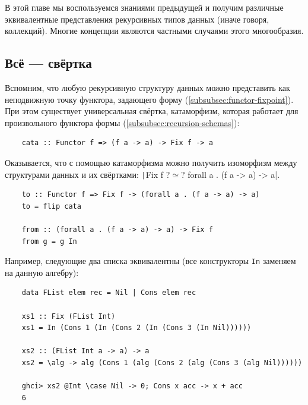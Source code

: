 
В этой главе мы воспользуемся знаниями предыдущей и получим различные эквивалентные представления рекурсивных типов данных (иначе говоря, коллекций).
Многие концепции являются частными случаями этого многообразия.

\subsection{Всё --- свёртка} \label{subsec:all-folds}

Вспомним, что любую рекурсивную структуру данных можно представить как неподвижную точку функтора, задающего форму (\ref{subsubsec:functor-fixpoint}).
При этом существует универсальная свёртка, катаморфизм, которая работает для произвольного функтора формы (\ref{subsubsec:recursion-schemas}):
\begin{verbatim}
    cata :: Functor f => (f a -> a) -> Fix f -> a
\end{verbatim}

Оказывается, что с помощью катаморфизма можно получить изоморфизм между структурами данных и их свёртками:
\texttt|Fix f ?$\simeq$? forall a . (f a -> a) -> a|.
\begin{verbatim}
    to :: Functor f => Fix f -> (forall a . (f a -> a) -> a)
    to = flip cata

    from :: (forall a . (f a -> a) -> a) -> Fix f
    from g = g In
\end{verbatim}

Например, следующие два списка эквивалентны (все конструкторы \texttt{In} заменяем на данную алгебру):
\begin{verbatim}
    data FList elem rec = Nil | Cons elem rec

    xs1 :: Fix (FList Int)
    xs1 = In (Cons 1 (In (Cons 2 (In (Cons 3 (In Nil))))))

    xs2 :: (FList Int a -> a) -> a
    xs2 = \alg -> alg (Cons 1 (alg (Cons 2 (alg (Cons 3 (alg Nil))))))

    ghci> xs2 @Int \case Nil -> 0; Cons x acc -> x + acc
    6
\end{verbatim}

